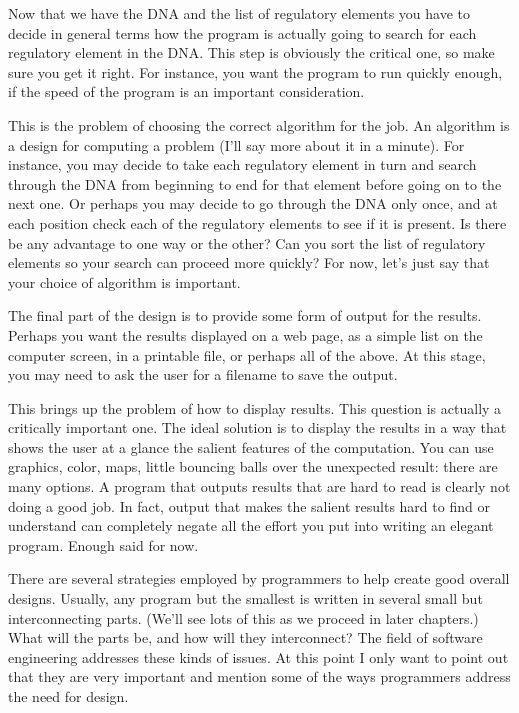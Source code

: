 Now that we have the DNA and the list of regulatory elements you have to decide in general terms how the program is actually going to search for each regulatory element in the DNA. This step is obviously the critical one, so make sure you get it right. For instance, you want the program to run quickly enough, if the speed of the program is an important consideration.

This is the problem of choosing the correct algorithm for the job. An algorithm is a design for computing a problem (I'll say more about it in a minute). For instance, you may decide to take each regulatory element in turn and search through the DNA from beginning to end for that element before going on to the next one. Or perhaps you may decide to go through the DNA only once, and at each position check each of the regulatory elements to see if it is present. Is there be any advantage to one way or the other? Can you sort the list of regulatory elements so your search can proceed more quickly? For now, let's just say that your choice of algorithm is important.

The final part of the design is to provide some form of output for the results. Perhaps you want the results displayed on a web page, as a simple list on the computer screen, in a printable file, or perhaps all of the above. At this stage, you may need to ask the user for a filename to save the output.

This brings up the problem of how to display results. This question is actually a critically important one. The ideal solution is to display the results in a way that shows the user at a glance the salient features of the computation. You can use graphics, color, maps, little bouncing balls over the unexpected result: there are many options. A program that outputs results that are hard to read is clearly not doing a good job. In fact, output that makes the salient results hard to find or understand can completely negate all the effort you put into writing an elegant program. Enough said for now.

There are several strategies employed by programmers to help create good overall designs. Usually, any program but the smallest is written in several small but interconnecting parts. (We'll see lots of this as we proceed in later chapters.) What will the parts be, and how will they interconnect? The field of software engineering addresses these kinds of issues. At this point I only want to point out that they are very important and mention some of the ways programmers address the need for design.

